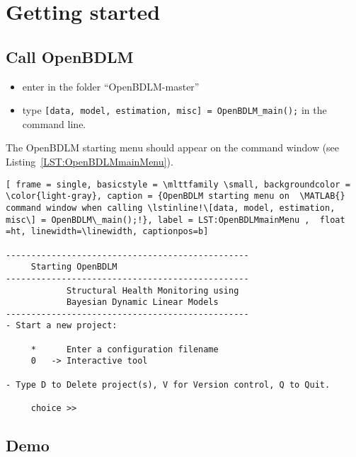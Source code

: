 \documentclass{article}
\begin{document}
\section{Getting started}

\subsection{Call OpenBDLM}
\begin{itemize}
\item enter in the folder ``OpenBDLM-master''
\item type \colorbox{light-gray}{\lstinline[basicstyle = \mlttfamily \small, backgroundcolor = \color{light-gray}]![data, model, estimation, misc] = OpenBDLM_main();! }
in the \MATLAB{} command line.
\end{itemize}
The OpenBDLM starting menu should appear on the \MATLAB{} command window (see Listing~\ref{LST:OpenBDLMmainMenu}).
\begin{lstlisting}[ frame = single, basicstyle = \mlttfamily \small, backgroundcolor = \color{light-gray}, caption = {OpenBDLM starting menu on  \MATLAB{} command window when calling \lstinline!\[data, model, estimation, misc\] = OpenBDLM\_main();!}, label = LST:OpenBDLMmainMenu ,  float =ht, linewidth=\linewidth, captionpos=b]

------------------------------------------------
     Starting OpenBDLM
------------------------------------------------
            Structural Health Monitoring using 
            Bayesian Dynamic Linear Models
------------------------------------------------
- Start a new project: 

     *      Enter a configuration filename 
     0   -> Interactive tool 

- Type D to Delete project(s), V for Version control, Q to Quit.

     choice >>
\end{lstlisting}


\subsection{Demo}
\end{document}

